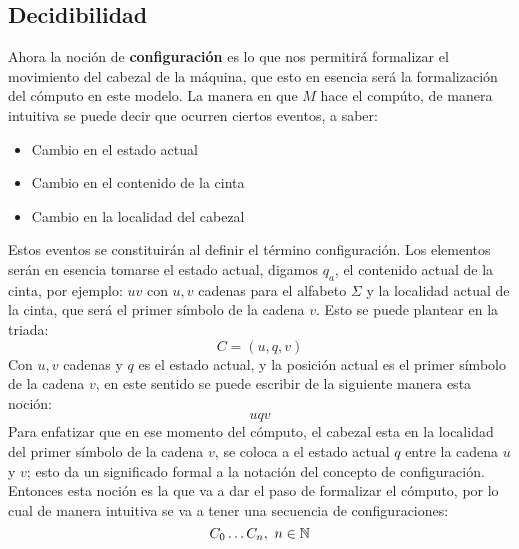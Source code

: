 \documentclass[10pt]{report}
\begin{document}
     \subsection{Decidibilidad}\label{subsec:decidibilidad2}
    Ahora la noción de \textbf{configuración} es lo que nos permitirá formalizar el movimiento del
    cabezal de la máquina, que esto en esencia será la formalización del cómputo en este modelo.
    \newline
    La manera en que $M$ hace el compúto, de manera intuitiva se puede decir que ocurren ciertos eventos, a saber:
    \begin{itemize}
        \item Cambio en el estado actual
        \item Cambio en el contenido de la cinta
        \item Cambio en la localidad del cabezal
    \end{itemize}
    Estos eventos se constituirán al definir el término configuración.
    Los elementos serán en esencia tomarse el estado actual, digamos $q_{a}$, el contenido actual de la cinta, por ejemplo:
    $uv$ con $u,v$ cadenas para el alfabeto $\Sigma$ y la localidad actual de la cinta, que será el primer
    símbolo de la cadena $v$. \newline
    Esto se puede plantear en la triada:
    \begin{equation}
        C = (u,q,v)
    \end{equation}
    Con $u,v$ cadenas y $q$ es el estado actual, y la posición actual es el primer símbolo de la cadena $v$,
    en este sentido se puede escribir de la siguiente manera esta noción:
    \begin{equation}
        uqv
    \end{equation}
    Para enfatizar que en ese momento del cómputo, el cabezal esta en la localidad del primer símbolo de la cadena
    $v$, se coloca a el estado actual $q$ entre la cadena $u$ y $v$; esto da un significado formal a la notación del concepto
    de configuración.
    \\
    \newline
    Entonces esta noción es la que va a dar el paso de formalizar el cómputo, por lo cual de manera intuitiva se va
    a tener una secuencia de configuraciones:\newline
    \begin{equation}
        C_{0}\mathellipsis C_{n},\ n\in\mathbb{N}
    \end{equation}
    \newline
\end{document}
